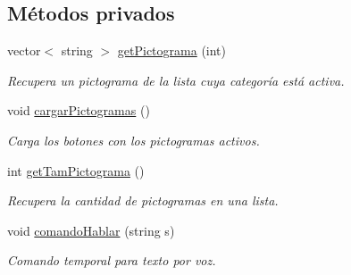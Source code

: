 \subsection*{Métodos privados}
\begin{DoxyCompactItemize}
\item 
vector$<$ string $>$ \hyperlink{classespacio_pictograma_a298954d50054dbfe58cccb1b6b0f704d}{get\+Pictograma} (int)
\begin{DoxyCompactList}\small\item\em Recupera un pictograma de la lista cuya categoría está activa. \end{DoxyCompactList}\item 
void \hyperlink{classespacio_pictograma_abfadb8b3f6ec9c8c7558ea6eef22b295}{cargar\+Pictogramas} ()
\begin{DoxyCompactList}\small\item\em Carga los botones con los pictogramas activos. \end{DoxyCompactList}\item 
int \hyperlink{classespacio_pictograma_aa1d237a0781e86d2cc44c65c0c500d28}{get\+Tam\+Pictograma} ()
\begin{DoxyCompactList}\small\item\em Recupera la cantidad de pictogramas en una lista. \end{DoxyCompactList}\item 
void \hyperlink{classespacio_pictograma_a3a9c44580cc4f78eb1793c9479b89e9f}{comando\+Hablar} (string s)
\begin{DoxyCompactList}\small\item\em Comando temporal para texto por voz. \end{DoxyCompactList}\end{DoxyCompactItemize}
